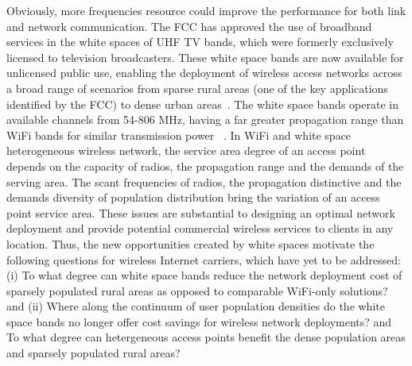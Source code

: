 Obviously, more frequencies resource could improve the performance for 
both link and network communication. The FCC has approved the use of broadband 
services in the white spaces of UHF TV bands, which were formerly exclusively 
licensed to television broadcasters. These white space bands are now available 
for unlicensed public use, enabling the deployment of wireless access networks 
across a broad range of scenarios from sparse rural areas (one of the key 
applications identified by the FCC) to dense urban areas~\cite{carlson}. The 
white space bands operate in available channels from 54-806 MHz, having a far 
greater propagation range than WiFi bands for similar transmission power
~\cite{balanis2012antenna}. In WiFi and white space heterogeneous wireless 
network, the service area degree of an access point depends on the capacity 
of radios, the propagation range and the demands of the serving area. The scant 
frequencies of radios, the propagation distinctive and the demands diversity 
of population distribution bring the variation of an access point service area. 
These issues are substantial to designing an optimal network deployment and 
provide potential commercial wireless services to clients in any location.
Thus, the new opportunities created by white spaces motivate the following 
questions for wireless Internet carriers, which have yet to be addressed: 
(i) To what degree can white space bands reduce the network deployment cost of
sparsely populated rural areas as opposed to comparable WiFi-only solutions? and 
(ii) Where along the continuum of user population densities do the white
space bands no longer offer cost savings for wireless network deployments?
and To what degree can hetergeneous access points benefit the dense 
population areas and sparsely populated rural areas?

